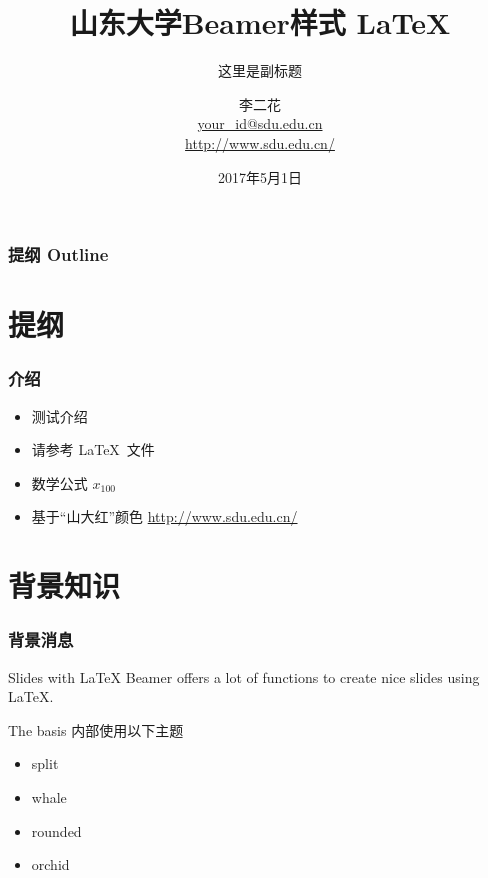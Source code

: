 \documentclass{beamer}
\title[SDU 样式 Beamer]{
  山东大学Beamer样式 \LaTeX}
\subtitle{这里是副标题}
\author[WANG Maomao]{
  李二花 \\\medskip
  {\small \url{your_id@sdu.edu.cn}} \\
  {\small \url{http://www.sdu.edu.cn/}}}
\institute[SHANDONG UNIVERSITY]{
  机械工程学院 \\ %
  山东大学}
\date[May. 01 2017]{
  2017年5月1日}
\begin{document}
\begin{frame}
  \titlepage
\end{frame}

\begin{frame}
  \frametitle{提纲 Outline}

  \tableofcontents
\end{frame}

\section{提纲}

\begin{frame}
  \frametitle{介绍}

  \begin{itemize}
    \item 测试介绍
    \item 请参考 \LaTeX\ 文件
    \item 数学公式 $x_{100}$
    \item 基于“山大红”颜色 \url{http://www.sdu.edu.cn/}
  \end{itemize}
\end{frame}

\section{背景知识}

\begin{frame}
  \frametitle{背景消息}

  \begin{block}{Slides with \LaTeX}
    Beamer offers a lot of functions to create nice slides using \LaTeX.
  \end{block}

  \begin{block}{The basis}
    内部使用以下主题
    \begin{itemize}
      \item split
      \item whale
      \item rounded
      \item orchid
    \end{itemize}
  \end{block}
\end{frame}
\end{document}
